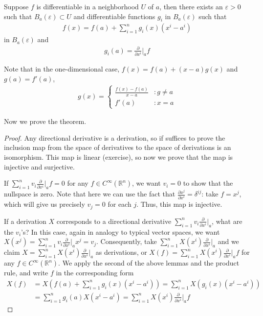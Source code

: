 \documentclass{../mathnotes}
\begin{document}
\begin{lem}
    Suppose $f$ is differentiable in a neighborhood $U$ of $a$, then there exists an $\varepsilon>0$ such that $B_a(\varepsilon)\subset U$
    and differentiable functions $g_i$ in $B_a(\varepsilon)$ such that
    \begin{align*}
        f(x)=f(a)+\sum_{i=1}^ng_i(x)(x^i-a^i)
    \end{align*}
    in $B_a(\varepsilon)$ and
    \begin{align*}
        g_i(a)=\frac{\partial}{\partial x^i}|_a f
    \end{align*}
\end{lem}

\begin{rem}
    Note that in the one-dimensional case, $f(x)=f(a)+(x-a)g(x)$ and $g(a)=f'(a)$,
    \begin{align*}
        g(x) = 
        \left\{
            \begin{array}{lr}
                \frac{f(x)-f(a)}{x-a} & : g\neq a\\
                f'(a) & : x=a
            \end{array}
        \right.
    \end{align*}
\end{rem}

Now we prove the theorem.

\begin{proof}
    Any directional derivative is a derivation, so if suffices to prove the inclusion map from the space of derivatives to the space of derivations is an isomorphism.
    This map is linear (exercise), so now we prove that the map is injective and surjective.
    
    If $\sum_{i=1}^n v_i\frac{\partial}{\partial x^i}|_a f=0$ for any $f\in C^\infty(\mathbb{R}^n)$, we want $v_i=0$ to show that the nullspace is zero.
    Note that here we can use the fact that $\frac{\partial x^j}{\partial x^i}=\delta^{ij}$: take $f=x^j$, which will give us precisely $v_j=0$ for each $j$.
    Thus, this map is injective.

    If a derivation $X$ corresponds to a directional derivative $\sum_{i=1}^nv_i\frac{\partial}{\partial x^i}|_a$, what are the $v_i$'s? In this case, again in analogy
    to typical vector spaces, we want $X(x^j)=\sum_{i=1}^nv_i\frac{\partial}{\partial x^i}|_ax^j=v_j$. Consequently, take $\sum_{i=1}^n X(x^i)\frac{\partial}{\partial x^i}|_a$
    and we claim $X=\sum_{i=1}^n X(x^i)\frac{\partial}{\partial x^i}|_a$ as derivations, or $X(f)=\sum_{i=1}^n X(x^i)\frac{\partial}{\partial x^i}|_af$ for any
    $f\in C^\infty(\mathbb{R}^n)$. We apply the second of the above lemmas and the product rule, and write $f$ in the corresponding form
    \begin{align*}
        X(f)&=X\left(f(a)+\sum_{i=1}^n g_i(x)(x^i-a^i)\right)=\sum_{i=1}^n X\left(g_i(x)(x^i-a^i)\right)\\
        &=\sum_{i=1}^n g_i(a)X(x^i-a^i) =\sum_{i=1}^nX(x^i)\frac{\partial}{\partial x^i}|_a f
    \end{align*}
\end{proof}
\end{document}
